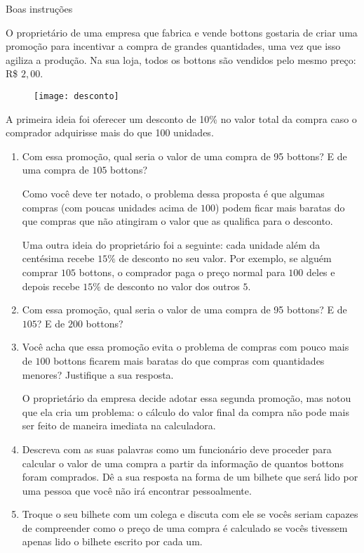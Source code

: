 \begin{task}{Boas instruções}
\label{comp-task1}

O proprietário de uma empresa que fabrica e vende bottons gostaria de criar uma promoção para incentivar a compra de grandes quantidades, uma vez que isso agiliza a produção. Na sua loja, todos os bottons são vendidos pelo mesmo preço: R\$ $2,00$.

\begin{figure}[H]
\centering
\texttt{[image: desconto]}
\end{figure}

A primeira ideia foi oferecer um desconto de 10\% no valor total da compra caso o comprador adquirisse mais do que 100 unidades.

\begin{enumerate}
\item Com essa promoção, qual seria o valor de uma compra de 95 bottons? E de uma compra de $105$ bottons?

Como você deve ter notado, o problema dessa proposta é que algumas compras (com poucas unidades acima de $100$) podem ficar mais baratas do que compras que não atingiram o valor que as qualifica para o desconto.

Uma outra ideia do proprietário foi a seguinte: cada unidade além da centésima recebe $15\%$ de desconto no seu valor. Por exemplo, se alguém comprar $105$ bottons, o comprador paga o preço normal para $100$ deles e depois recebe $15\%$ de desconto no valor dos outros $5$.

\item Com essa promoção, qual seria o valor de uma compra de 95 bottons? E de $105$? E de $200$ bottons?

\item Você acha que essa promoção evita o problema de compras com pouco mais de $100$ bottons ficarem mais baratas do que compras com quantidades menores? Justifique a sua resposta.

O proprietário da empresa decide adotar essa segunda promoção, mas notou que ela cria um problema: o cálculo do valor final da compra não pode mais ser feito de maneira imediata na calculadora.

\item Descreva com as suas palavras como um funcionário deve proceder para calcular o valor de uma compra a partir da informação de quantos bottons foram comprados. Dê a sua resposta na forma de um bilhete que será lido por uma pessoa que você não irá encontrar pessoalmente.

\item Troque o seu bilhete com um colega e discuta com ele se vocês seriam capazes de compreender como o preço de uma compra é calculado se vocês tivessem apenas lido o bilhete escrito por cada um.
\end{enumerate}

\end{task}
\clearpage

